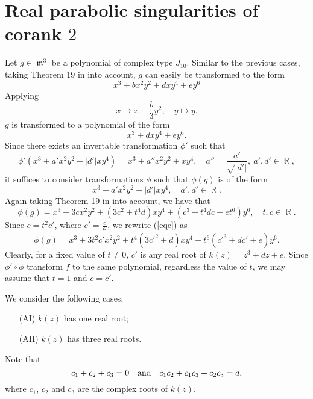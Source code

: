\documentclass[noend]{amsproc}
\theoremstyle{definition}
\DeclareMathOperator{\m}{\mathfrak{m}}
\DeclareMathOperator{\R}{\mathbb{R}}
\begin{document}
\section{Real parabolic singularities of corank $2$}

Let $g\in\m^3$ be a polynomial of complex type $J_{10}$. Similar to the previous cases, taking Theorem 19 in \cite{realclassify2} into account, $g$ can easily be transformed to the form
\[x^3+bx^2y^2+dxy^4+ey^6\] Applying
\begin{equation}\label{Cancelling2ndTerm}
x\mapsto x-\frac{b}{3}y^2,\quad y\mapsto y.
\end{equation}
$g$ is transformed to a polynomial of the form
\[x^3+dxy^4+ey^6.\] Since there exists an
invertable transformation $\phi'$ such that
\begin{equation}\label{phi'}
\phi'(x^3+a'x^2y^2\pm |d'|xy^4)=x^3+a''x^2y^2\pm xy^4,\quad
a''=\frac{a'}{\sqrt{|d'|}},\ a',d'\in \R,
\end{equation}
it suffices to consider transformations $\phi$ such that $\phi(g)$ is of the
form
\begin{equation}\label{form}
x^3+a'x^2y^2\pm |d'|xy^4,\quad a',d'\in \R.
\end{equation}
Again taking Theorem 19 in \cite{realclassify2}  into account, we have that
\begin{equation}\label{eqc}
\phi(g)=x^3+3cx^2y^2+(3c^2+t^4d)xy^4+(c^3+t^4dc+et^6)y^6,\quad t,c\in\R.
\end{equation}
Since $c=t^2c'$, where $c'=\frac{c}{t^2}$, we rewrite (\ref{eqc}) as
\begin{equation}\label{eqc'}
\phi(g)=x^3+3t^2c'x^2y^2+t^4(3c'^2+d)xy^4+t^6(c'^3+dc'+e)y^6.
\end{equation}
Clearly, for a fixed value of $t\neq 0$, $c'$ is any real root of
$k(z)=z^3+dz+e$. Since $\phi'\circ\phi$ transform $f$ to the same polynomial,
regardless the value of $t$, we may assume that $t=1$ and $c=c'$.

We consider the following cases:
\begin{itemize}
\item[(AI)]$k(z)$ has one real root;
\item[(AII)]$k(z)$ has three real roots.
\end{itemize}

Note that
\begin{equation}\label{RelationOfRoots}
c_1+c_2+c_3=0\quad\textnormal{and}\quad c_1c_2+c_1c_3+c_2c_3=d,
\end{equation}
where $c_1$, $c_2$ and $c_3$ are the complex roots of $k(z)$.
\end{document}
